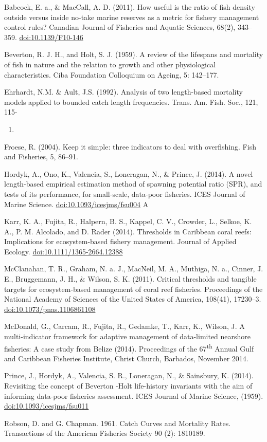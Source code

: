 \documentclass[]{book}
\begin{document}
Babcock, E. a., \& MacCall, A. D. (2011). How useful is the ratio of
fish density outside versus inside no-take marine reserves as a metric
for fishery management control rules? Canadian Journal of Fisheries and
Aquatic Sciences, 68(2), 343--359. \url{doi:10.1139/F10-146}

Beverton, R. J. H., and Holt, S. J. (1959). A review of the lifespans
and mortality of fish in nature and the relation to growth and other
physiological characteristics. Ciba Foundation Colloquium on Ageing, 5:
142--177.

Ehrhardt, N.M. \& Ault, J.S. (1992). Analysis of two length-based
mortality models applied to bounded catch length frequencies. Trans. Am.
Fish. Soc., 121, 115-

\begin{enumerate}
\def\labelenumi{\arabic{enumi}.}
\setcounter{enumi}{121}
\item
\end{enumerate}

Froese, R. (2004). Keep it simple: three indicators to deal with
overfishing. Fish and Fisheries, 5, 86--91.

Hordyk, A., Ono, K., Valencia, S., Loneragan, N., \& Prince, J. (2014).
A novel length-based empirical estimation method of spawning potential
ratio (SPR), and tests of its performance, for small-scale, data-poor
fisheries. ICES Journal of Marine Science.
\url{doi:10.1093/icesjms/fsu004} A

Karr, K. A., Fujita, R., Halpern, B. S., Kappel, C. V., Crowder, L.,
Selkoe, K. A., P. M. Alcolado, and D. Rader (2014). Thresholds in
Caribbean coral reefs: Implications for ecosystem-based fishery
management. Journal of Applied Ecology.
\url{doi:10.1111/1365-2664.12388}

McClanahan, T. R., Graham, N. a. J., MacNeil, M. A., Muthiga, N. a.,
Cinner, J. E., Bruggemann, J. H., \& Wilson, S. K. (2011). Critical
thresholds and tangible targets for ecosystem-based management of coral
reef fisheries. Proceedings of the National Academy of Sciences of the
United States of America, 108(41), 17230--3.
\url{doi:10.1073/pnas.1106861108}

McDonald, G., Carcam, R., Fujita, R., Gedamke, T., Karr, K., Wilson, J.
A multi-indicator framework for adaptive management of data-limited
nearshore fisheries: A case study from Belize (2014). Proceedings of the
67\textsuperscript{th} Annual Gulf and Caribbean Fisheries Institute,
Christ Church, Barbados, November 2014.

Prince, J., Hordyk, A., Valencia, S. R., Loneragan, N., \& Sainsbury, K.
(2014). Revisiting the concept of Beverton -Holt life-history invariants
with the aim of informing data-poor fisheries assessment. ICES Journal
of Marine Science, (1959). \url{doi:10.1093/icesjms/fsu011}

Robson, D. and G. Chapman. 1961. Catch Curves and Mortality Rates.
Transactions of the American Fisheries Society 90 (2): 1810189.


\end{document}
